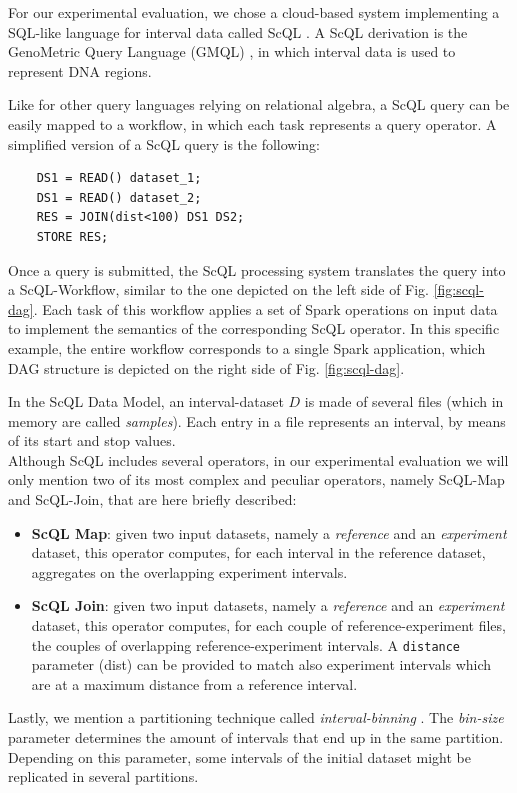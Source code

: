 \documentclass[a4paper, 10pt, conference]{ieeeconf}      %
\begin{document}
\noindent 
For our experimental evaluation, we chose a cloud-based system implementing a SQL-like language for interval data called ScQL \cite{ScQL}. A ScQL derivation is the GenoMetric Query Language (GMQL) \cite{gmql}, in which interval data is used to represent DNA regions.

Like for other query languages relying on relational algebra, a ScQL query can be easily mapped to a workflow, in which each task represents a query operator.
A simplified version of a ScQL query is the following:
\begin{verbatim}
    DS1 = READ() dataset_1;
    DS1 = READ() dataset_2;
    RES = JOIN(dist<100) DS1 DS2; 
    STORE RES;
\end{verbatim}
Once a query is submitted, the ScQL processing system translates the query into a ScQL-Workflow, similar to the one depicted on the left side of Fig. \ref{fig:scql-dag}.
Each task of this workflow applies a set of Spark operations on input data to implement the semantics of the corresponding ScQL operator. In this specific example, the entire workflow corresponds to a single Spark application, which DAG structure is depicted on the right side of Fig. \ref{fig:scql-dag}.

In the ScQL Data Model, an interval-dataset $D$ is made of several files (which in memory are called \textit{samples}). Each entry in a file represents an interval, by means of its start and stop values.\\
Although ScQL includes several operators, in our experimental evaluation we will only mention two of its most complex and peculiar operators, namely ScQL-Map and ScQL-Join, that are here briefly described: 
\begin{itemize}
    \item \textbf{ScQL Map}: given two input datasets,  namely a \textit{reference} and an \textit{experiment} dataset, this operator computes, for each interval in the reference dataset, aggregates on the overlapping experiment intervals. 
    \item \textbf{ScQL Join}: given two input datasets, namely a \textit{reference} and an \textit{experiment} dataset, this operator computes, for each couple of reference-experiment files, the couples of overlapping reference-experiment intervals.  A \texttt{distance} parameter (dist) can be provided to match also experiment intervals which are at a maximum distance from a reference interval. 
\end{itemize}
Lastly, we mention a partitioning technique called \textit{interval-binning} \cite{binning}. The \textit{bin-size} parameter determines the amount of intervals that end up in the same partition. Depending on this parameter, some intervals of the initial dataset might be replicated in several partitions.
\end{document}
